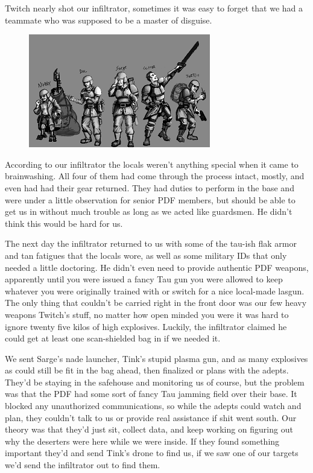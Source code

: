 Twitch nearly shot our infiltrator, sometimes it was easy to forget that we had a teammate who was supposed to be a master of disguise.

\begin{figure}
	\begin{center}
		\includegraphics[width=\figwidth]{pics/10/44.png}
	\end{center}
\end{figure}
According to our infiltrator the locals weren't anything special when it came to brainwashing. 
All four of them had come through the process intact, mostly, and even had had their gear returned. 
They had duties to perform in the base and were under a little observation for senior PDF members, but should be able to get us in without much trouble as long as we acted like guardsmen. 
He didn't think this would be hard for us.

The next day the infiltrator returned to us with some of the tau-ish flak armor and tan fatigues that the locals wore, as well as some military IDs that only needed a little doctoring. 
He didn't even need to provide authentic PDF weapons, apparently until you were issued a fancy Tau gun you were allowed to keep whatever you were originally trained with or switch for a nice local-made lasgun. 
The only thing that couldn't be carried right in the front door was our few heavy weapons Twitch's stuff, no matter how open minded you were it was hard to ignore twenty five kilos of high explosives. 
Luckily, the infiltrator claimed he could get at least one scan-shielded bag in if we needed it.

We sent Sarge's nade launcher, Tink's stupid plasma gun, and as many explosives as could still be fit in the bag ahead, then finalized or plans with the adepts. 
They'd be staying in the safehouse and monitoring us of course, but the problem was that the PDF had some sort of fancy Tau jamming field over their base. 
It blocked any unauthorized communications, so while the adepts could watch and plan, they couldn't talk to us or provide real assistance if shit went south. 
Our theory was that they'd just sit, collect data, and keep working on figuring out why the deserters were here while we were inside. 
If they found something important they'd and send Tink's drone to find us, if we saw one of our targets we'd send the infiltrator out to find them.

